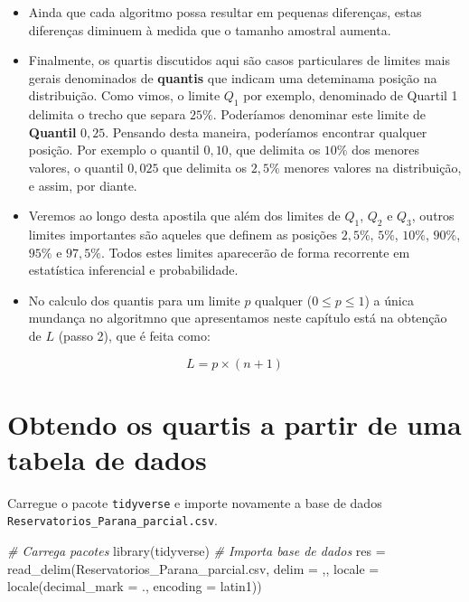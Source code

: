 \documentclass[
]{book}
\newenvironment{Shaded}{\begin{snugshade}}{\end{snugshade}}
\newcommand{\AttributeTok}[1]{\textcolor[rgb]{0.77,0.63,0.00}{#1}}
\newcommand{\CommentTok}[1]{\textcolor[rgb]{0.56,0.35,0.01}{\textit{#1}}}
\newcommand{\FunctionTok}[1]{\textcolor[rgb]{0.00,0.00,0.00}{#1}}
\newcommand{\NormalTok}[1]{#1}
\newcommand{\OtherTok}[1]{\textcolor[rgb]{0.56,0.35,0.01}{#1}}
\newcommand{\StringTok}[1]{\textcolor[rgb]{0.31,0.60,0.02}{#1}}
\begin{document}
\begin{itemize}
\item
  Ainda que cada algoritmo possa resultar em pequenas diferenças, estas diferenças diminuem à medida que o tamanho amostral aumenta.
\item
  Finalmente, os quartis discutidos aqui são casos particulares de limites mais gerais denominados de \textbf{quantis} que indicam uma deteminama posição na distribuição. Como vimos, o limite \(Q_1\) por exemplo, denominado de Quartil 1 delimita o trecho que separa \(25\%\). Poderíamos denominar este limite de \textbf{Quantil} \(0,25\). Pensando desta maneira, poderíamos encontrar qualquer posição. Por exemplo o quantil \(0,10\), que delimita os \(10\%\) dos menores valores, o quantil \(0,025\) que delimita os \(2,5\%\) menores valores na distribuição, e assim, por diante.
\item
  Veremos ao longo desta apostila que além dos limites de \(Q_1\), \(Q_2\) e \(Q_3\), outros limites importantes são aqueles que definem as posições \(2,5\%\), \(5\%\), \(10\%\), \(90\%\), \(95\%\) e \(97,5\%\). Todos estes limites aparecerão de forma recorrente em estatística inferencial e probabilidade.
\item
  No calculo dos quantis para um limite \(p\) qualquer (\(0 \le p \le 1\)) a única mundança no algoritmno que apresentamos neste capítulo está na obtenção de \(L\) (passo 2), que é feita como:
\end{itemize}

\[L = p \times (n+1)\]

\hypertarget{obtendo-os-quartis-a-partir-de-uma-tabela-de-dados}{%
\section{Obtendo os quartis a partir de uma tabela de dados}\label{obtendo-os-quartis-a-partir-de-uma-tabela-de-dados}}

Carregue o pacote \texttt{tidyverse} e importe novamente a base de dados \texttt{Reservatorios\_Parana\_parcial.csv}.

\begin{Shaded}
\begin{Highlighting}[]
\CommentTok{\# Carrega pacotes}
\FunctionTok{library}\NormalTok{(tidyverse)}
\CommentTok{\# Importa base de dados }
\NormalTok{res }\OtherTok{=} \FunctionTok{read\_delim}\NormalTok{(}\StringTok{\textquotesingle{}Reservatorios\_Parana\_parcial.csv\textquotesingle{}}\NormalTok{,}
                  \AttributeTok{delim =} \StringTok{\textquotesingle{},\textquotesingle{}}\NormalTok{,}
                  \AttributeTok{locale =} \FunctionTok{locale}\NormalTok{(}\AttributeTok{decimal\_mark =} \StringTok{\textquotesingle{}.\textquotesingle{}}\NormalTok{,}
                                  \AttributeTok{encoding =} \StringTok{\textquotesingle{}latin1\textquotesingle{}}\NormalTok{))}
\end{Highlighting}
\end{Shaded}
\end{document}
